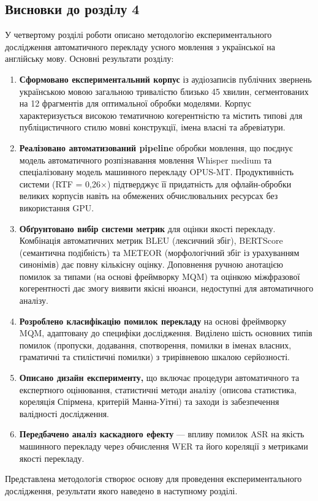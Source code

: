 \subsection*{Висновки до розділу 4}

У четвертому розділі роботи описано методологію експериментального дослідження
автоматичного перекладу усного мовлення з української на англійську мову.
Основні результати розділу:

\begin{enumerate}

\item \textbf{Сформовано експериментальний корпус} із аудіозаписів
публічних звернень українською мовою загальною тривалістю близько 45 хвилин,
сегментованих на 12 фрагментів для оптимальної обробки моделями.
Корпус характеризується високою тематичною когерентністю та містить
типові для публіцистичного стилю мовні конструкції, імена власні та
абревіатури.

\item \textbf{Реалізовано автоматизований pipeline} обробки мовлення,
що поєднує модель автоматичного розпізнавання мовлення Whisper medium
та спеціалізовану модель машинного перекладу OPUS-MT.
Продуктивність системи (RTF = 0,26$\times$) підтверджує
її придатність для офлайн-обробки великих корпусів навіть на
обмежених обчислювальних ресурсах без використання GPU.

\item \textbf{Обґрунтовано вибір системи метрик} для оцінки якості
перекладу. Комбінація автоматичних метрик BLEU (лексичний збіг),
BERTScore (семантична подібність) та METEOR (морфологічний збіг із
урахуванням синонімів) дає повну кількісну оцінку.
Доповнення ручною анотацією помилок за типами (на основі фреймворку
MQM) та оцінкою міжфразової когерентності дає змогу виявити якісні
нюанси, недоступні для автоматичного аналізу.

\item \textbf{Розроблено класифікацію помилок перекладу} на основі
фреймворку MQM, адаптовану до специфіки дослідження. Виділено шість
основних типів помилок (пропуски, додавання, спотворення, помилки
в іменах власних, граматичні та стилістичні помилки) з трирівневою
шкалою серйозності.

\item \textbf{Описано дизайн експерименту,} що включає процедури
автоматичного та експертного оцінювання, статистичні методи аналізу
(описова статистика, кореляція Спірмена, критерій Манна-Уітні) та
заходи із забезпечення валідності дослідження.

\item \textbf{Передбачено аналіз каскадного ефекту} — впливу помилок
ASR на якість машинного перекладу через обчислення WER та його
кореляції з метриками якості перекладу.

\end{enumerate}

Представлена методологія створює основу для проведення експериментального
дослідження, результати якого наведено в наступному розділі.
